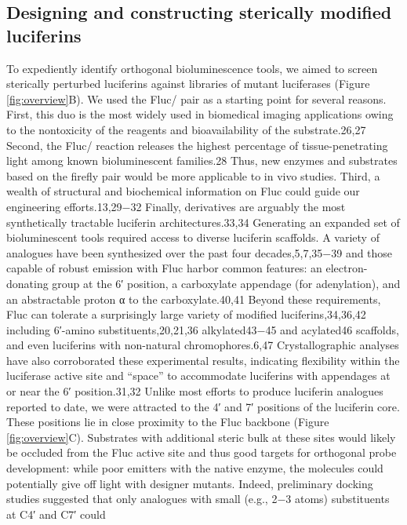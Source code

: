 \subsection*{Designing and constructing sterically modified luciferins}
To expediently identify orthogonal bioluminescence
tools, we aimed to screen sterically perturbed luciferins
against libraries of mutant luciferases (Figure \ref{fig:overview}B). We used the
Fluc/\dluciferin{} pair as a starting point for several reasons. First,
this duo is the most widely used in biomedical imaging
applications owing to the nontoxicity of the reagents and
bioavailability of the substrate.26,27 Second, the Fluc/\dluciferin{}
reaction releases the highest percentage of tissue-penetrating
light among known bioluminescent families.28 Thus, new
enzymes and substrates based on the firefly pair would be more
applicable to in vivo studies. Third, a wealth of structural and
biochemical information on Fluc could guide our engineering
efforts.13,29−32 Finally, \dluciferin{} derivatives are arguably the
most synthetically tractable luciferin architectures.33,34
Generating an expanded set of bioluminescent tools required
access to diverse luciferin scaffolds. A variety of \dluciferin{}
analogues have been synthesized over the past four
decades,5,7,35−39 and those capable of robust emission with
Fluc harbor common features: an electron-donating group at
the 6′ position, a carboxylate appendage (for adenylation), and
an abstractable proton α to the carboxylate.40,41 Beyond these
requirements, Fluc can tolerate a surprisingly large variety of
modified luciferins,34,36,42 including 6′-amino substituents,20,21,36
alkylated43−45 and acylated46 scaffolds, and even
luciferins with non-natural chromophores.6,47 Crystallographic
analyses have also corroborated these experimental results,
indicating flexibility within the luciferase active site and “space”
to accommodate luciferins with appendages at or near the 6′
position.31,32
Unlike most efforts to produce luciferin analogues reported
to date, we were attracted to the 4′ and 7′ positions of the
luciferin core. These positions lie in close proximity to the Fluc
backbone (Figure \ref{fig:overview}C). Substrates with additional steric bulk at
these sites would likely be occluded from the Fluc active site
and thus good targets for orthogonal probe development: while
poor emitters with the native enzyme, the molecules could
potentially give off light with designer mutants. Indeed,
preliminary docking studies suggested that only analogues
with small (e.g., 2−3 atoms) substituents at C4′ and C7′ could
